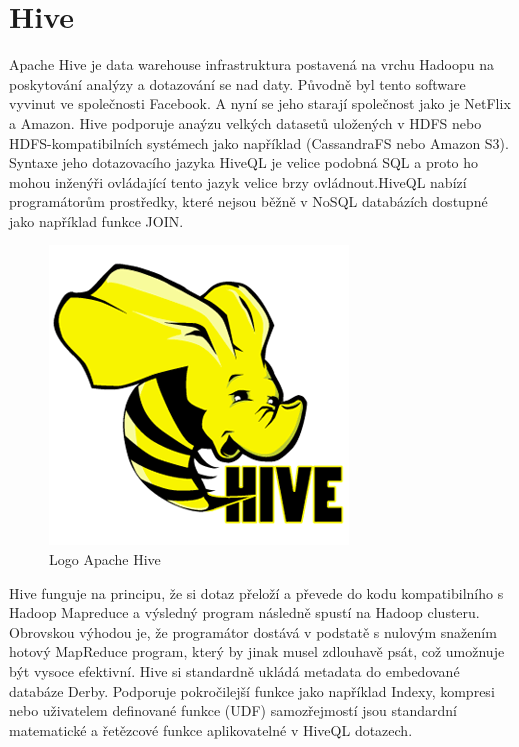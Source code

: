 \documentclass[thesis=M,czech]{FITthesis}[2012/06/26]
\begin{document}
\section{Hive}


Apache Hive je data warehouse infrastruktura postavená na vrchu Hadoopu na poskytování analýzy a dotazování se nad daty. Původně byl tento software vyvinut ve společnosti Facebook. A nyní se jeho starají společnost jako je NetFlix a Amazon. Hive podporuje anaýzu velkých datasetů uložených v HDFS nebo HDFS-kompatibilních systémech jako například (CassandraFS nebo Amazon S3). Syntaxe jeho dotazovacího jazyka HiveQL je velice podobná SQL a proto ho mohou inženýři ovládající tento jazyk velice brzy ovládnout.HiveQL nabízí programátorům prostředky, které nejsou běžně v NoSQL databázích dostupné jako například funkce JOIN. 

\begin{figure}
  \centering
    \includegraphics[scale=0.5]{images/hive_logo}
\caption{Logo Apache Hive}

\end{figure}

Hive funguje na principu, že si dotaz přeloží a převede do kodu kompatibilního s Hadoop Mapreduce a výsledný program následně spustí na Hadoop clusteru. Obrovskou výhodou je, že programátor dostává v podstatě s nulovým snažením hotový MapReduce program, který by jinak musel zdlouhavě psát, což umožnuje být vysoce efektivní. Hive si standardně ukládá metadata do embedované databáze Derby. Podporuje pokročilejší funkce jako například Indexy, kompresi nebo uživatelem definované funkce (UDF) samozřejmostí jsou standardní matematické a řetězcové funkce aplikovatelné v HiveQL dotazech. 
\end{document}
